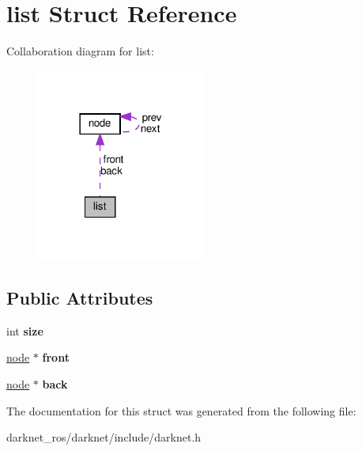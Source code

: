 \hypertarget{structlist}{}\section{list Struct Reference}
\label{structlist}


Collaboration diagram for list\+:
\nopagebreak
\begin{figure}[H]
\begin{center}
\leavevmode
\includegraphics[width=158pt]{structlist__coll__graph}
\end{center}
\end{figure}
\subsection*{Public Attributes}
\begin{DoxyCompactItemize}
\item 
\mbox{\label{structlist_a3b03adad0c0429bae9493667ff366dc2}} 
int {\bfseries size}
\item 
\mbox{\label{structlist_ab5edf0018b269f7eae3d7100ddcea049}} 
\hyperlink{structnode}{node} $\ast$ {\bfseries front}
\item 
\mbox{\label{structlist_a92ca5a25484052f219cddb80380a3013}} 
\hyperlink{structnode}{node} $\ast$ {\bfseries back}
\end{DoxyCompactItemize}


The documentation for this struct was generated from the following file\+:\begin{DoxyCompactItemize}
\item 
darknet\+\_\+ros/darknet/include/darknet.\+h\end{DoxyCompactItemize}
